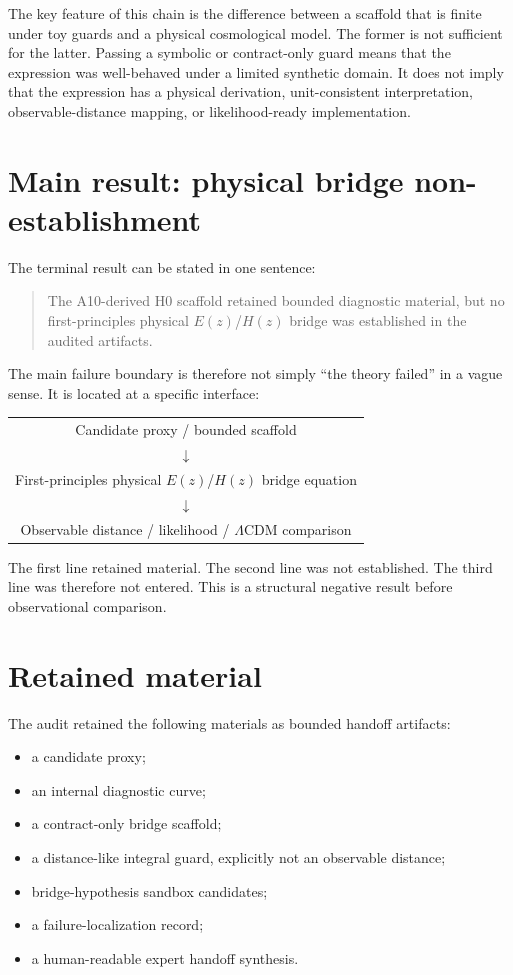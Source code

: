 \documentclass[11pt,a4paper]{article}
\newcommand{\LCDM}{$\Lambda$CDM}
\newcommand{\Ez}{$E(z)$}
\newcommand{\Hz}{$H(z)$}
\begin{document}
The key feature of this chain is the difference between a scaffold that is finite under toy guards and a physical cosmological model. The former is not sufficient for the latter. Passing a symbolic or contract-only guard means that the expression was well-behaved under a limited synthetic domain. It does not imply that the expression has a physical derivation, unit-consistent interpretation, observable-distance mapping, or likelihood-ready implementation.

\section{Main result: physical bridge non-establishment}

The terminal result can be stated in one sentence:

\begin{quote}
The A10-derived H0 scaffold retained bounded diagnostic material, but no first-principles physical \Ez{}/\Hz{} bridge was established in the audited artifacts.
\end{quote}

The main failure boundary is therefore not simply ``the theory failed'' in a vague sense. It is located at a specific interface:

\begin{center}
\begin{tabular}{c}
Candidate proxy / bounded scaffold \\
$\downarrow$ \\
First-principles physical \Ez{}/\Hz{} bridge equation \\
$\downarrow$ \\
Observable distance / likelihood / \LCDM{} comparison
\end{tabular}
\end{center}

The first line retained material. The second line was not established. The third line was therefore not entered. This is a structural negative result before observational comparison.

\section{Retained material}

The audit retained the following materials as bounded handoff artifacts:

\begin{itemize}[leftmargin=7mm]
\item a candidate proxy;
\item an internal diagnostic curve;
\item a contract-only bridge scaffold;
\item a distance-like integral guard, explicitly not an observable distance;
\item bridge-hypothesis sandbox candidates;
\item a failure-localization record;
\item a human-readable expert handoff synthesis.
\end{itemize}
\end{document}
